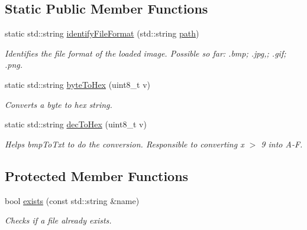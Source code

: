 \subsection*{Static Public Member Functions}
\begin{DoxyCompactItemize}
\item 
static std\+::string \mbox{\hyperlink{classImage_ac4e8db14cfd60a6a7085e6fcb83488a4}{identify\+File\+Format}} (std\+::string \mbox{\hyperlink{classImage_aec8a33f176362d146da8c058798ebbff}{path}})
\begin{DoxyCompactList}\small\item\em Identifies the file format of the loaded image. Possible so far\+: .bmp; .jpg,; .gif; .png. \end{DoxyCompactList}\item 
static std\+::string \mbox{\hyperlink{classImage_ac1c14eba8a20f8bb71c3c21eaba90ecb}{byte\+To\+Hex}} (uint8\+\_\+t v)
\begin{DoxyCompactList}\small\item\em Converts a byte to hex string. \end{DoxyCompactList}\item 
static std\+::string \mbox{\hyperlink{classImage_a26f7e0b2649e2529df7e7aea46f2da4a}{dec\+To\+Hex}} (uint8\+\_\+t v)
\begin{DoxyCompactList}\small\item\em Helps bmp\+To\+Txt to do the conversion. Responsible to converting x $>$ 9 into A-\/F. \end{DoxyCompactList}\end{DoxyCompactItemize}
\subsection*{Protected Member Functions}
\begin{DoxyCompactItemize}
\item 
bool \mbox{\hyperlink{classImage_a83d7183bfcd632649c36504d9ab07e36}{exists}} (const std\+::string \&name)
\begin{DoxyCompactList}\small\item\em Checks if a file already exists. \end{DoxyCompactList}\end{DoxyCompactItemize}
